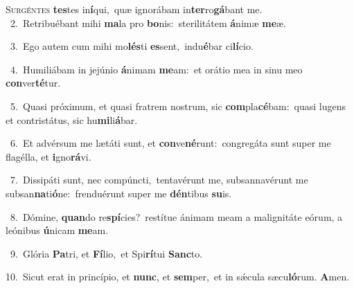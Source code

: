 \lettrine{\initial\textcolor{\initialcolor}{S}}{urgéntes} \textbf{tes}\-tes in\-\textbf{í}\-qui,~\star quæ ignorábam in\-\textbf{ter}\-ro\-\textbf{gá}\-bant me.\\
{\numbfont\textcolor{\numbcolor}{~2.}}~Retribuébant mihi \textbf{ma}\-la pro \textbf{bo}\-nis:~\star sterilitátem \textbf{á}\-nimæ \textbf{me}\-æ.\par
{\numbfont\textcolor{\numbcolor}{~3.}}~Ego autem cum mihi mo\-\textbf{lés}\-ti \textbf{es}\-sent,~\star indu\-\textbf{é}\-bar ci\-\textbf{lí}\-cio.\par
{\numbfont\textcolor{\numbcolor}{~4.}}~Humiliábam in jejúnio \textbf{á}\-nimam \textbf{me}\-am:~\star et orátio mea in sinu meo \textbf{con}\-ver\-\textbf{té}\-tur.\par
{\numbfont\textcolor{\numbcolor}{~5.}}~Quasi próximum, et quasi fratrem nostrum, sic \textbf{com}\-pla\-\textbf{cé}\-bam:~\star quasi lugens et contristátus, sic hu\-\textbf{mi}\-li\-\textbf{á}\-bar.\par
{\numbfont\textcolor{\numbcolor}{~6.}}~Et advérsum me lætáti sunt, et \textbf{con}\-ve\-\textbf{né}\-runt:~\star congregáta sunt super me flagélla, et \textbf{i}\-gno\-\textbf{rá}\-vi.\par
{\numbfont\textcolor{\numbcolor}{~7.}}~Dissipáti sunt, nec compúncti,~\dagger tentavérunt me, subsannavérunt me subsan\-\textbf{na}\-ti\-\textbf{ó}\-ne:~\star frenduérunt super me \textbf{dén}\-tibus \textbf{su}\-is.\par
{\numbfont\textcolor{\numbcolor}{~8.}}~Dómine, \textbf{quan}\-do re\-\textbf{spí}\-cies?~\star restítue ánimam meam a malignitáte eórum, a leónibus \textbf{ú}\-nicam \textbf{me}\-am.\par
{\numbfont\textcolor{\numbcolor}{~9.}}~Glória \textbf{Pa}\-tri, et \textbf{Fí}\-lio,~\star et Spi\-\textbf{rí}\-tui \textbf{Sanc}\-to.\par
{\numbfont\textcolor{\numbcolor}{10.}}~Sicut erat in princípio, et \textbf{nunc}\-, et \textbf{sem}\-per,~\star et in sǽcula sæcu\-\textbf{ló}\-rum. \textbf{A}\-men.\par

